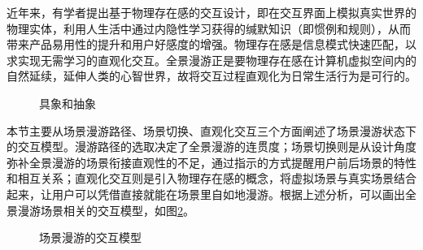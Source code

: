 近年来，有学者提出基于物理存在感的交互设计，即在交互界面上模拟真实世界的物理实体，利用人生活中通过内隐性学习获得的缄默知识（即惯例和规则），从而带来产品易用性的提升和用户好感度的增强。物理存在感是信息模式快速匹配，以求实现无需学习的直观化交互。全景漫游正是要物理存在感在计算机虚拟空间内的自然延续，延伸人类的心智世界，故将交互过程直观化为日常生活行为是可行的。

\begin{figure}[htp]
\centering
{}
\caption{具象和抽象}
\label{fig:wysiwyg}
\end{figure}

本节主要从场景漫游路径、场景切换、直观化交互三个方面阐述了场景漫游状态下的交互模型。漫游路径的选取决定了全景漫游的连贯度；场景切换则是从设计角度弥补全景漫游的场景衔接直观性的不足，通过指示的方式提醒用户前后场景的特性和相互关系；直观化交互则是引入物理存在感的概念，将虚拟场景与真实场景结合起来，让用户可以凭借直接就能在场景里自如地漫游。根据上述分析，可以画出全景漫游场景相关的交互模型，如图\ref{fig:vr}。

\begin{figure}[htp]
\centering
\fbox{
\texttt{[image: vr]}
}
\caption{场景漫游的交互模型}
\label{fig:vr}
\end{figure}